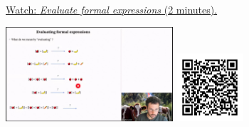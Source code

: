
\begin{minipage}{10cm}
    \href{https://act4e-spring21.netlify.app/videos/spring2021-monads-b:eval-formal-expr.html}{Watch: \emph{Evaluate formal expressions} (2 minutes).}
        
    \href{https://act4e-spring21.netlify.app/videos/spring2021-monads-b:eval-formal-expr.html}{\includegraphics[height=3.5cm]{spring2021-monads-b:eval-formal-expr/thumbnails.jpg}}
    \href{https://act4e-spring21.netlify.app/videos/spring2021-monads-b:eval-formal-expr.html}{\includegraphics[height=2.5cm]{spring2021-monads-b:eval-formal-expr/qrcode.png}}
\end{minipage}
